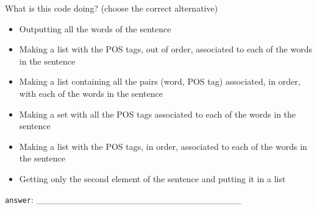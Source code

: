 \documentclass[a4paper,11pt]{scrartcl}
\begin{document}
What is this code doing?
(choose the correct alternative)

\begin{itemize}
\singlespacing
\item Outputting all the words of the sentence

\item Making a list with the POS tags, out of order, associated to each of the words in the sentence

\item Making a list containing all the pairs (word, POS tag) associated, in order, with each of the words in the sentence

\item Making a set with all the POS tags associated to each of the words in the sentence

\item Making a list with the POS tags, in order, associated to each of the words in the sentence

\item Getting only the second element of the sentence and putting it in a list
\end{itemize}

\verb|answer|: \_\_\_\_\_\_\_\_\_\_\_\_\_\_\_\_\_\_\_\_\_\_\_\_\_\_\_\_\_\_\_\_
\end{document}
